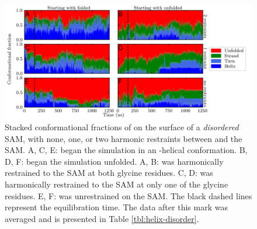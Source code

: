 \begin{figure}
    \center
    \includegraphics[width=\double]{figures-helix/disordered_helicity.png}
    \caption[Stacked conformational fractions of \pep{} on a disordered SAM]{
        Stacked conformational fractions of \pep{} on the surface of a \emph{disordered} SAM, with none, one, or two harmonic restraints between \pep{} and the SAM. 
        A, C, E: \pep{} began the simulation in an \textalpha{}-helical conformation. 
        B, D, F: \pep{} began the simulation unfolded. 
        A, B: \pep{} was harmonically restrained to the SAM at both glycine residues. 
        C, D: \pep{} was harmonically restrained to the SAM at only one of the glycine residues. 
        E, F: \pep{} was unrestrained on the SAM. 
        The black dashed lines represent the equilibration time. 
        The data after this mark was averaged and is presented in Table \ref{tbl:helix-disorder}. 
    }
    \label{fig:helix-disorder}
\end{figure}

\begin{table}
    \caption[Conformational fractions on the peptide on a disordered SAM]{Average conformational fractions from simulations of \pep{} on the surface of a \emph{disordered} SAM in which either none, one, or both of the glycine residues in the peptide are harmonically restrained to the SAM.}
    \begin{center}
    \end{center}
    \label{tbl:helix-disorder}
\end{table}

